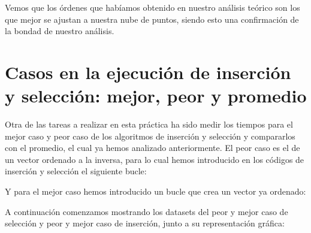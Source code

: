 \documentclass[10pt,a4paper]{article}
\begin{document}
Vemos que los órdenes que habíamos obtenido en nuestro análisis teórico son los que mejor se ajustan a nuestra nube de puntos, siendo esto una confirmación de la bondad de nuestro análisis.

\section{Casos en la ejecución de inserción y selección: mejor, peor y promedio}

Otra de las tareas a realizar en esta práctica ha sido medir los tiempos para el mejor caso y peor caso de los algoritmos de inserción y selección y compararlos con el promedio, el cual ya hemos analizado anteriormente. El peor caso es el de un vector ordenado a la inversa, para lo cual hemos introducido en los códigos de inserción y selección el siguiente bucle:



Y para el mejor caso hemos introducido un bucle que crea un vector ya ordenado:



A continuación comenzamos mostrando los datasets del peor y mejor caso de selección y peor y mejor caso de inserción, junto a su representación gráfica:

\begin{table}[h!]
	\centering
	\footnotesize
	\hspace{2cm}
	\hspace{2cm}
	\caption{Datasets de la ejecución del peor caso para Selección}
\end{table}
\end{document}
